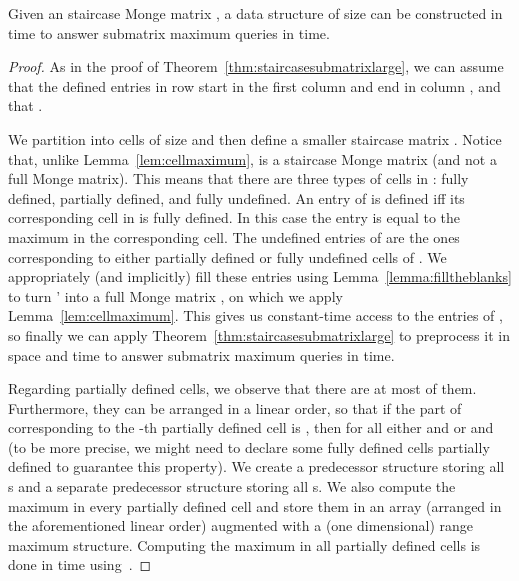 \documentclass{llncs}
\begin{document}
\begin{theorem}
\label{thm:staircasesubmatrix}
Given an  staircase Monge matrix , a data structure of size  can be constructed
in  time to answer submatrix maximum queries in  time.
\end{theorem}

\begin{proof}
As in the proof of Theorem~\ref{thm:staircasesubmatrixlarge}, we can assume that the defined entries in row  
start in the first column and end in column , and that  .

We partition  into cells of size  and then define a  smaller  
staircase matrix . Notice that, unlike Lemma~\ref{lem:cellmaximum},  is a staircase Monge matrix (and not a full Monge matrix). This means that there are three types of cells in : fully defined, partially defined, and fully undefined. An entry of  is defined iff its corresponding cell in  is
fully defined. In this case the entry is equal to the maximum in the corresponding
cell. The undefined entries of  are the ones corresponding to either partially defined or fully undefined cells of . 
We appropriately (and implicitly)  fill these entries using Lemma~\ref{lemma:filltheblanks} to turn ' into a full Monge
matrix , on which we apply Lemma~\ref{lem:cellmaximum}. This gives us
constant-time access to the entries of , so finally we can apply Theorem~\ref{thm:staircasesubmatrixlarge}
to preprocess it in  space and  time to answer submatrix maximum queries
in  time.

Regarding partially defined
cells, we observe that there are at most  of them. Furthermore, they can be arranged in a linear order, so that if the part of 
corresponding to the -th partially defined cell is , then
for all  either  and  or  and 
(to be more precise, we might need to declare some fully defined cells partially defined to
guarantee this property). We create a predecessor structure storing all s and a separate
predecessor structure storing all s. We also compute the maximum in every partially
defined cell and store them in an array (arranged in the aforementioned linear order) augmented
with a (one dimensional) range maximum structure. Computing the maximum in all partially defined
cells is done in  time using~\cite{KK89}.


\end{proof}
\end{document}
